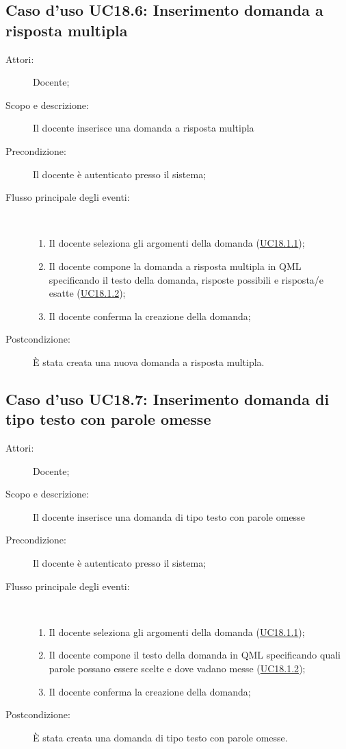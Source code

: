 \subsection{Caso d'uso UC18.6: Inserimento domanda a risposta multipla}\begin{description}
\item[Attori:] Docente;
\item[Scopo e descrizione:] Il docente inserisce una domanda a risposta multipla
      \item[Precondizione:] Il docente è autenticato presso il sistema;

        \item[Flusso principale degli eventi:] \ 
 \begin{enumerate}
          \item Il docente seleziona gli argomenti della domanda (\hyperlink{UC18.1.1}{UC18.1.1});
          \item Il docente compone la domanda a risposta multipla in QML specificando il testo della domanda, risposte possibili e risposta/e esatte (\hyperlink{UC18.1.2}{UC18.1.2});
          \item Il docente conferma la creazione della domanda;

      \end{enumerate}
    \item[Postcondizione:] È stata creata una nuova domanda a risposta multipla.
  \end{description}
\hypertarget{UC18.7}{}
\subsection{Caso d'uso UC18.7: Inserimento domanda di tipo testo con parole omesse}\begin{description}
\item[Attori:] Docente;
\item[Scopo e descrizione:] Il docente inserisce una domanda di tipo testo con parole omesse
      \item[Precondizione:] Il docente è autenticato presso il sistema;

        \item[Flusso principale degli eventi:] \ 
 \begin{enumerate}
          \item Il docente seleziona gli argomenti della domanda (\hyperlink{UC18.1.1}{UC18.1.1});
          \item Il docente compone il testo della domanda in QML specificando quali parole possano essere scelte e dove vadano messe  (\hyperlink{UC18.1.2}{UC18.1.2});
          \item Il docente conferma la creazione della domanda;

      \end{enumerate}
    \item[Postcondizione:] È stata creata una domanda di tipo testo con parole omesse.
  \end{description}
\hypertarget{UC18.8}{}
